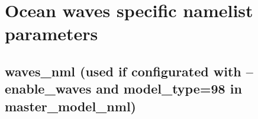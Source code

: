 %
%
%

\section{Ocean waves specific namelist parameters}

\subsection{waves\_nml (used if configurated with --enable\_waves and model\_type=98 in master\_model\_nml)}


